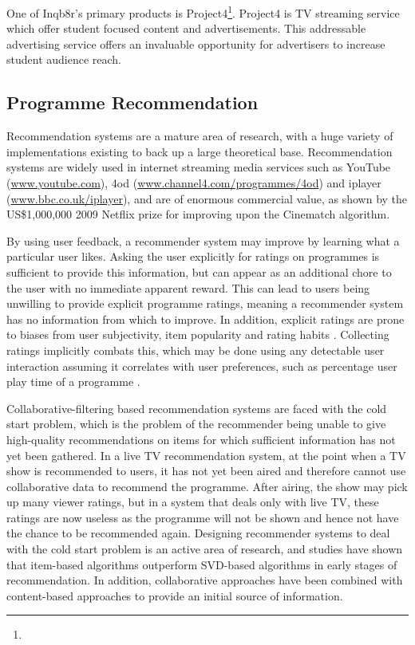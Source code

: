 	One of Inqb8r's primary products is Project4\footnote{}. Project4 is TV streaming service which offer student focused content and advertisements. This addressable advertising service offers an invaluable opportunity for advertisers to increase student audience reach.

	\subsection{Programme Recommendation}

	Recommendation systems are a mature area of research, with a huge variety of implementations existing to back up a large theoretical base. Recommendation systems are widely used in internet streaming media services such as YouTube (\url{www.youtube.com}), 4od (\url{www.channel4.com/programmes/4od}) and iplayer (\url{www.bbc.co.uk/iplayer}), and are of enormous commercial value, as shown by the US\$1,000,000 2009 Netflix prize \citep{pragmatic_chaos} for improving upon the Cinematch algorithm.

	By using user feedback, a recommender system may improve by learning what a particular user likes. Asking the user explicitly for ratings on programmes is sufficient to provide this information, but can appear as an additional chore to the user with no immediate apparent reward. This can lead to users being unwilling to provide explicit programme ratings, meaning a recommender system has no information from which to improve. In addition, explicit ratings are prone to biases from user subjectivity, item popularity and rating habits \citep[p.~304]{recommender-systems-handbook}. Collecting ratings implicitly combats this, which may be done using any detectable user interaction assuming it correlates with user preferences, such as percentage user play time of a programme \citep[p.~305]{recommender-systems-handbook}.

	Collaborative-filtering based recommendation systems are faced with the cold start problem, which is the problem of the recommender being unable to give high-quality recommendations on items for which sufficient information has not yet been gathered. In a live TV recommendation system, at the point when a TV show is recommended to users, it has not yet been aired and therefore cannot use collaborative data to recommend the programme. After airing, the show may pick up many viewer ratings, but in a system that deals only with live TV, these ratings are now useless as the programme will not be shown and hence not have the chance to be recommended again. Designing recommender systems to deal with the cold start problem is an active area of research, and studies have shown that item-based algorithms outperform SVD-based algorithms in early stages of recommendation\citep{cold-start-problem}. In addition, collaborative approaches have been combined with content-based approaches to provide an initial source of information\citep{generative_models}.

